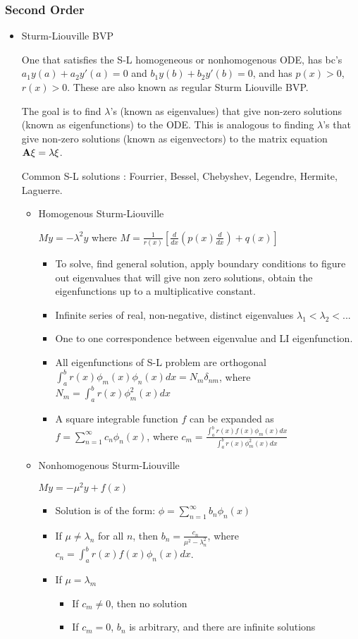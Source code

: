 \documentclass[a4paper,12pt]{article}
\begin{document}
\subsubsection{Second Order}
	\begin{itemize}
	\item Sturm-Liouville BVP
	
	One that satisfies the S-L homogeneous or nonhomogenous ODE, has bc's $a_1y(a)+a_2y'(a)=0$ and $b_1y(b)+b_2y'(b)=0$, and has $p(x)>0$, $r(x)>0$. These are also known as regular Sturm Liouville BVP. 
		
	The goal is to find $\lambda$'s (known as eigenvalues) that give non-zero solutions (known as eigenfunctions) to the ODE. This is analogous to finding $\lambda$'s that give non-zero solutions (known as eigenvectors) to the matrix equation $\bold{A}\xi=\lambda \xi$.
	
	Common S-L solutions : Fourrier, Bessel, Chebyshev, Legendre, Hermite, Laguerre. 
		\begin{itemize}
		\item Homogenous Sturm-Liouville 
		
		$My=-\lambda^2y$ where $M=\frac{1}{r(x)}\left[\frac{d}{dx}\left(p(x)\frac{d}{dx}\right)+q(x)\right]$
			\begin{itemize}
			\item To solve, find general solution, apply boundary conditions to figure out eigenvalues that will give non zero solutions, obtain the eigenfunctions up to a multiplicative constant.
			\item Infinite series of real, non-negative, distinct eigenvalues $\lambda_1<\lambda_2<...$
			\item One to one correspondence between eigenvalue and LI eigenfunction.
			\item All eigenfunctions of S-L problem are orthogonal $\int_a^b r(x)\phi_m(x)\phi_n(x)dx=N_m\delta_{nm}$, where $N_m=\int_a^br(x)\phi_m^2(x)dx$
			\item A square integrable function $f$ can be expanded as $f=\displaystyle\sum_{n=1}^{\infty}c_n \phi_n(x)$, where $c_m=\frac{\int_a^br(x)f(x)\phi_m(x)dx}{\int_a^br(x)\phi_m^2(x)dx}$
			\end{itemize}
		\item Nonhomogenous Sturm-Liouville
		
		$My=-\mu^2y+f(x)$
			\begin{itemize}
			\item Solution is of the form: $\phi=\displaystyle\sum_{n=1}^{\infty}b_n \phi_n(x)$
			\item If $\mu \neq \lambda_n$ for all $n$, then $b_n=\frac{c_n}{\mu^2-\lambda_n^2}$, where $c_n=\int_a^br(x)f(x)\phi_n(x)dx$.
			\item If $\mu=\lambda_m$
				\begin{itemize}
				\item If $c_m\neq0$, then no solution
				\item If $c_m=0$, $b_n$ is arbitrary, and there are infinite solutions
				\end{itemize}
			\end{itemize}
			

\end{itemize}
\end{itemize}
\end{document}
